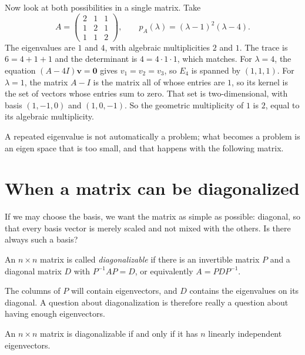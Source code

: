 Now look at both possibilities in a single matrix. Take
\[
  A=\begin{pmatrix}2&1&1\\ 1&2&1\\ 1&1&2\end{pmatrix},\qquad
  p_{A}(\lambda)=(\lambda-1)^{2}(\lambda-4).
\]
The eigenvalues are $1$ and $4$, with algebraic multiplicities $2$ and $1$. The trace is
$6=4+1+1$ and the determinant is $4=4\cdot1\cdot1$, which matches. For $\lambda=4$, the equation
$(A-4I)\mathbf{v}=\mathbf{0}$ gives $v_{1}=v_{2}=v_{3}$, so $E_{4}$ is spanned by $(1,1,1)$. For
$\lambda=1$, the matrix $A-I$ is the matrix all of whose entries are $1$, so its kernel is the set
of vectors whose entries sum to zero. That set is two-dimensional, with basis $(1,-1,0)$ and
$(1,0,-1)$. So the geometric multiplicity of $1$ is $2$, equal to its algebraic multiplicity.

A repeated eigenvalue is not automatically a problem; what becomes a problem is an eigen space
that is too small, and that happens with the following matrix.

\section{When a matrix can be diagonalized}

If we may choose the basis, we want the matrix as simple as possible: diagonal, so that every
basis vector is merely scaled and not mixed with the others. Is there always such a basis?

\begin{definisi}[Diagonalizable]
An $n\times n$ matrix is called \emph{diagonalizable} if there is an invertible matrix $P$ and a
diagonal matrix $D$ with $P^{-1}AP=D$, or equivalently $A=PDP^{-1}$.
\end{definisi}


The columns of $P$ will contain eigenvectors, and $D$ contains the eigenvalues on its diagonal. A
question about diagonalization is therefore really a question about having enough eigenvectors.

\begin{teorema}
An $n\times n$ matrix is diagonalizable if and only if it has $n$ linearly independent
eigenvectors.
\end{teorema}


